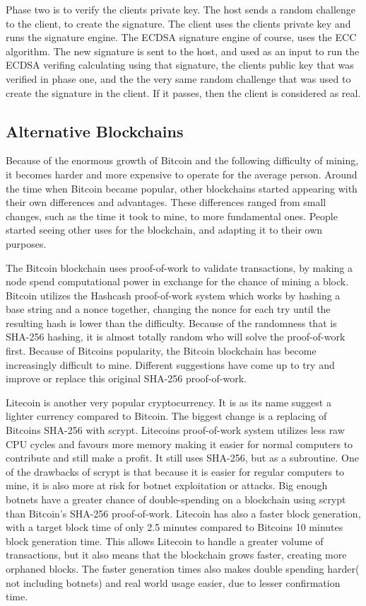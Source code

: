 \documentclass[12pt]{article}
\begin{document}
Phase two is to verify the clients private key. The host sends a random challenge to the client, to create the signature. The client uses the clients private key and runs the signature engine. The ECDSA signature engine of course, uses the ECC algorithm. The new signature is sent to the host, and used as an input to run the ECDSA verifing calculating using that signature, the clients public key that was verified in phase one, and the the very same random challenge that was used to create the signature in the client. If it passes, then the client is considered as real. 

\subsection{Alternative Blockchains}\label{subsec:difblocks}
Because of the enormous growth of Bitcoin and the following difficulty of mining, it becomes harder and more expensive to operate for the average person. Around the time when Bitcoin became popular, other blockchains started appearing with their own differences and advantages. These differences ranged from small changes, such as the time it took to mine, to more fundamental ones. People started seeing other uses for the blockchain, and adapting it to their own purposes. 

The Bitcoin blockchain uses proof-of-work to validate transactions, by making a node spend computational power in exchange for the chance of mining a block. Bitcoin utilizes the Hashcash\cite{hashcash} proof-of-work system which works by hashing a base string and a nonce together, changing the nonce for each try until the resulting hash is lower than the difficulty. Because of the randomness that is SHA-256 hashing, it is almost totally random who will solve the proof-of-work first. Because of Bitcoins popularity, the Bitcoin blockchain has become increasingly difficult to mine. Different suggestions have come up to try and improve or replace this original SHA-256 proof-of-work. 

Litecoin is another very popular cryptocurrency. It is as its name suggest a lighter currency compared to Bitcoin. The biggest change is a replacing of Bitcoins SHA-256 with scrypt. Litecoins proof-of-work system utilizes less raw CPU cycles and favours more memory making it easier for normal computers to contribute and still make a profit\cite{ahamad2013survey}. It still uses SHA-256, but as a subroutine. One of the drawbacks of scrypt is that because it is easier for regular computers to mine, it is also more at risk for botnet exploitation or attacks. Big enough botnets have a greater chance of double-spending on a blockchain using scrypt than Bitcoin's SHA-256 proof-of-work. Litecoin has also a faster block generation, with a target block time of only 2.5 minutes compared to Bitcoins 10 minutes block generation time. This allows Litecoin to handle a greater volume of transactions, but it also means that the blockchain grows faster, creating more orphaned blocks. The faster generation times also makes double spending harder( not including botnets) and real world usage easier, due to lesser confirmation time. 
\end{document}
